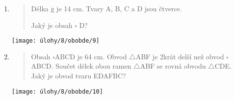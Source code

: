 \begin{enumerate}
\begin{minipage}[t]{\linewidth}
    \end{minipage}

    \item
    \begin{minipage}[t]{\linewidth}
        \begin{quote}
            Délka $\overline{\text{g}}$ je 14 cm. Tvary A, B, C a D jsou čtverce.

            Jaký je obsah $\square$ D?
        \end{quote}
        \centering
        \texttt{[image: úlohy/8/obobde/9]}

    \end{minipage}

    \item
    \begin{minipage}[t]{\linewidth}
        \begin{quote}
            Obsah $\square$ABCD je 64 cm.
            Obvod $\triangle$ABF je 2krát delší než obvod $\square$ABCD. Součet délek obou ramen $\triangle$ABF se rovná obvodu $\triangle$CDE. Jaký je obvod tvaru EDAFBC?
        \end{quote}
        \centering
        \texttt{[image: úlohy/8/obobde/10]}

    \end{minipage}
\end{enumerate}


\newpage

